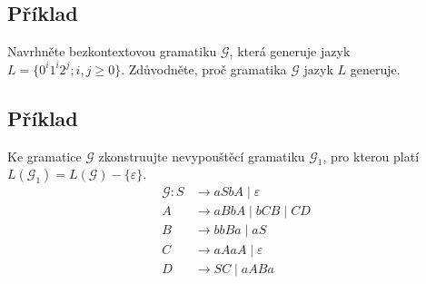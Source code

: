 \subsection{Příklad}
Navrhněte bezkontextovou gramatiku $\mathcal{G}$, která generuje jazyk $L = \{0^i 1^i 2^j; i,j \geq 0\}$. Zdůvodněte, 
proč gramatika $\mathcal{G}$ jazyk $L$ generuje.

\subsection{Příklad}
Ke gramatice $\mathcal{G}$ zkonstruujte nevypouštěcí gramatiku $\mathcal{G}_1$, pro kterou platí 
$L(\mathcal{G}_1) = L(\mathcal{G}) - \{\varepsilon\}$.
\begin{align*}
    \mathcal{G}: S &\rightarrow aSbA \mid \varepsilon\\
    A &\rightarrow aBbA \mid bCB \mid CD\\
    B &\rightarrow bbBa \mid aS\\
    C &\rightarrow aAaA \mid \varepsilon\\
    D &\rightarrow SC \mid aABa
\end{align*}
